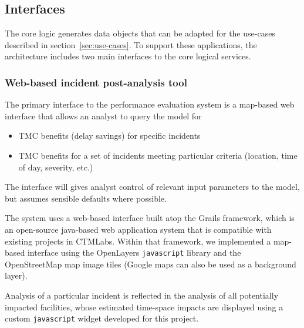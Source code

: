 \documentclass[12pt]{report}
\newif\ifuserguide %
\newcounter{time}
\newcounter{space}
\begin{document}



\subsection{Interfaces}
\label{sec:interfaces}

The core logic generates data objects that can be adapted for the
use-cases described in section~\ref{sec:use-cases}.  To support these
applications, the architecture includes two main interfaces to the
core logical services.  

\subsubsection{Web-based incident post-analysis tool}

The primary interface to the performance evaluation system is a
map-based web interface that allows an analyst to query the model for
\begin{itemize}
\item \ac{TMC} benefits (delay savings) for specific incidents
\item \ac{TMC} benefits for a set of incidents meeting particular criteria
  (location, time of day, severity, etc.)
\end{itemize}
The interface will gives analyst control of relevant input parameters
to the model, but assumes sensible defaults where possible.

The system uses a web-based interface built atop the Grails framework, which is
an open-source java-based web application system that is compatible with
existing projects in \ac{CTMLabs}.  Within that framework, we implemented a
map-based interface using the OpenLayers \texttt{javascript} library
\citep{openlayers10:_openl_user_guide} and the OpenStreetMap map image tiles
\citep{openstreetmap.org10:_opens_devel_guide} (Google maps can also be used as
a background layer).

Analysis of a particular incident is reflected in the analysis of all
potentially impacted facilities, whose estimated time-space impacts are
displayed using a custom \texttt{javascript} widget developed for this project.


\ifuserguide%
Additional detail of the user interface is provided in
appendix~\ref{chap:user-guide}.  
%
\fi
\end{document}
